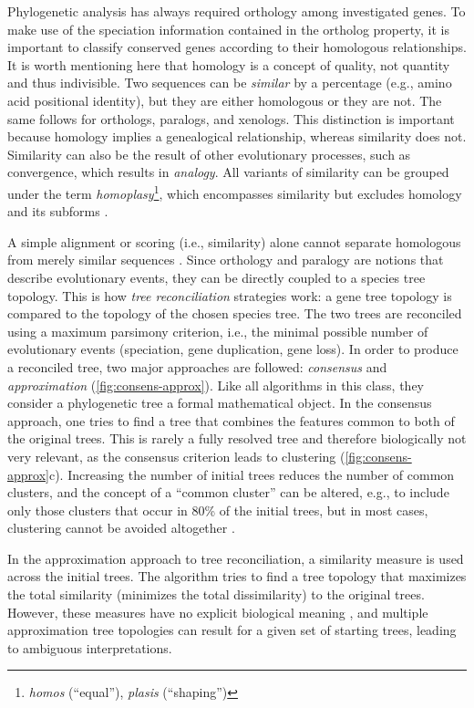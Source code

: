 Phylogenetic analysis has always required orthology among investigated genes.
To make use of the speciation information contained in the ortholog property, it
is important to classify conserved genes according to their homologous
relationships. It is worth mentioning here that homology is a concept of
quality, not quantity \citep{reeck1987} and thus indivisible. Two sequences can
be \emph{similar} by a percentage (e.g., amino acid positional identity), but
they are either homologous or they are not. The same follows for orthologs,
paralogs, and xenologs. This distinction is important because homology implies a
genealogical relationship, whereas similarity does not. Similarity can also be
the result of other evolutionary processes, such as convergence, which results
in \emph{analogy}. All variants of similarity can be grouped under the term
\emph{homoplasy}\footnote{\emph{homos} (``equal''), \emph{plasis}
(``shaping'')}, which encompasses similarity but excludes homology and its
subforms \citep{page1998}.

A simple alignment or scoring (i.e., similarity) alone cannot separate
homologous from merely similar sequences \citep{eisen1998}. Since orthology and
paralogy are notions that describe evolutionary events, they can be directly
coupled to a species tree topology. This is how \emph{tree reconciliation}
strategies work: a gene tree topology is compared to the topology of the chosen
species tree. The two trees are reconciled using a maximum parsimony criterion,
i.e., the minimal possible number of evolutionary events (speciation, gene
duplication, gene loss). In order to produce a reconciled tree, two major
approaches are followed: \emph{consensus} and \emph{approximation}
(\autoref{fig:consens-approx}). Like all algorithms in this class, they consider
a phylogenetic tree a formal mathematical object. In the consensus approach, one
tries to find a tree that combines the features common to both of the original
trees. This is rarely a fully resolved tree and therefore biologically not very
relevant, as the consensus criterion leads to clustering
(\autoref{fig:consens-approx}c). Increasing the number of initial trees reduces
the number of common clusters, and the concept of a ``common cluster'' can be
altered, e.g., to include only those clusters that occur in 80\% of the initial
trees, but in most cases, clustering cannot be avoided altogether
\citep{mirkin1995}.



In the approximation approach to tree reconciliation, a similarity measure is
used across the initial trees. The algorithm tries to find a tree topology that
maximizes the total similarity (minimizes the total dissimilarity) to the
original trees. However, these measures have no explicit biological meaning
\citep{mirkin1995}, and multiple approximation tree topologies can result for a
given set of starting trees, leading to ambiguous interpretations. 

